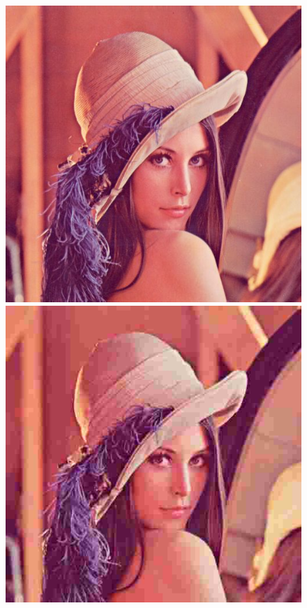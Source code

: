 \documentclass[12pt,a4paper]{article}
\begin{document}
\begin{figure}[h]
\centering
\begin{minipage}{.5\textwidth}
  \centering
  \includegraphics[scale=0.3]{lena80}
\end{minipage}%
\begin{minipage}{.5\textwidth}
  \centering
  \includegraphics[scale=0.3]{lena10}
\end{minipage}
\end{figure}
\end{document}
